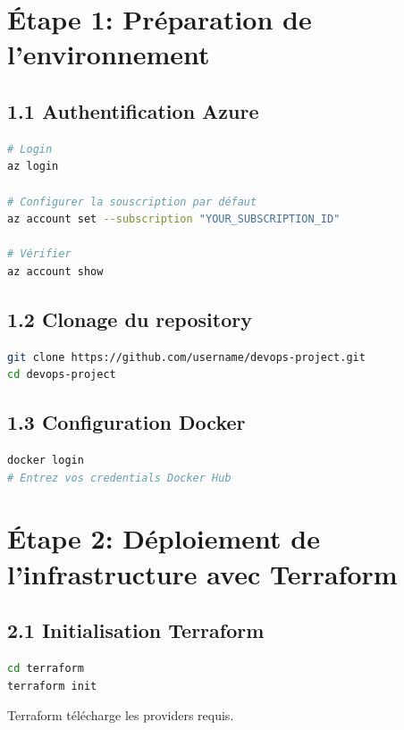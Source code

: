 \documentclass[12pt,a4paper,twoside]{report}
\begin{document}
\section{Étape 1: Préparation de l'environnement}

\subsection{1.1 Authentification Azure}

\begin{lstlisting}[language=bash]
# Login
az login

# Configurer la souscription par défaut
az account set --subscription "YOUR_SUBSCRIPTION_ID"

# Vérifier
az account show
\end{lstlisting}

\subsection{1.2 Clonage du repository}

\begin{lstlisting}[language=bash]
git clone https://github.com/username/devops-project.git
cd devops-project
\end{lstlisting}

\subsection{1.3 Configuration Docker}

\begin{lstlisting}[language=bash]
docker login
# Entrez vos credentials Docker Hub
\end{lstlisting}

\section{Étape 2: Déploiement de l'infrastructure avec Terraform}

\subsection{2.1 Initialisation Terraform}

\begin{lstlisting}[language=bash]
cd terraform
terraform init
\end{lstlisting}

Terraform télécharge les providers requis.
\end{document}
